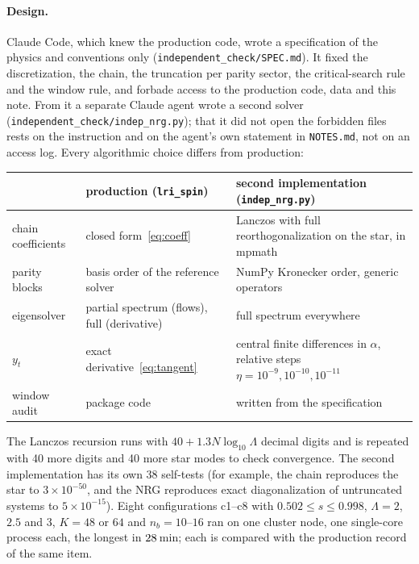\documentclass[10pt,a4paper]{article}
\newcommand{\code}[1]{\texttt{#1}}
\begin{document}
\paragraph{Design.} Claude Code, which knew the production code, wrote a specification of the physics and conventions only
(\code{independent\_check/SPEC.md}). It fixed the discretization, the chain, the truncation per parity sector, the critical-search rule
and the window rule, and forbade access to the production code, data and this note. From it a separate Claude agent wrote a second
solver (\code{independent\_check/indep\_nrg.py}); that it did not open the forbidden files rests on the instruction and on the agent's
own statement in \code{NOTES.md}, not on an access log. Every algorithmic choice differs from production:
\begin{center}\footnotesize
\begin{tabular}{@{}p{2.6cm}p{5.4cm}p{7.6cm}@{}}\toprule
 & production (\code{lri\_spin}) & second implementation (\code{indep\_nrg.py})\\\midrule
chain coefficients & closed form~\eqref{eq:coeff} & Lanczos with full reorthogonalization on the star, in mpmath\\
parity blocks & basis order of the reference solver & NumPy Kronecker order, generic operators\\
eigensolver & partial spectrum (flows), full (derivative) & full spectrum everywhere\\
$y_t$ & exact derivative~\eqref{eq:tangent} & central finite differences in $\alpha$, relative steps $\eta=10^{-9},10^{-10},10^{-11}$\\
window audit & package code & written from the specification\\\bottomrule
\end{tabular}
\end{center}
The Lanczos recursion runs with $40+1.3N\log_{10}\Lambda$ decimal digits and is repeated with 40 more digits and 40 more star modes to
check convergence. The second implementation has its own 38 self-tests (for example, the chain reproduces the star to $3\times10^{-50}$,
and the NRG reproduces exact diagonalization of untruncated systems to $5\times10^{-15}$). Eight configurations c1--c8 with
$0.502\le s\le0.998$, $\Lambda=2$, $2.5$ and $3$, $K=48$ or $64$ and $n_b=10$--$16$ ran on one cluster node, one single-core process
each, the longest in $28$\,min; each is compared with the production record of the same item.
\end{document}
